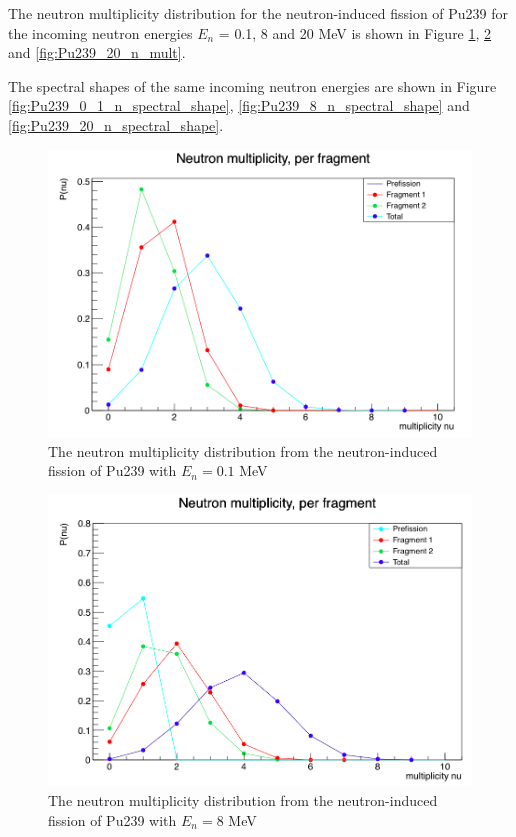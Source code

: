 \documentclass[]{article}
\begin{document}
The neutron multiplicity distribution for the neutron-induced fission of Pu239 for the incoming neutron energies $E_n$ = 0.1, 8 and 20 MeV is shown in Figure \ref{fig:Pu239_0_1_n_mult}, \ref{fig:Pu239_8_n_mult} and \ref{fig:Pu239_20_n_mult}.

The spectral shapes of the same incoming neutron energies are shown in Figure \ref{fig:Pu239_0_1_n_spectral_shape}, \ref{fig:Pu239_8_n_spectral_shape} and \ref{fig:Pu239_20_n_spectral_shape}.

\begin{figure} [H]
	\centering
	\includegraphics[scale=0.36]{Pu239_0_1_n_mult.png}
	\caption{The neutron multiplicity distribution from the neutron-induced fission of Pu239 with $E_n = 0.1$ MeV}
	\label{fig:Pu239_0_1_n_mult}
\end{figure}

\begin{figure} [H]
	\centering
	\includegraphics[scale=0.36]{Pu239_8_n_mult.png}
	\caption{The neutron multiplicity distribution from the neutron-induced fission of Pu239 with $E_n = 8$ MeV}
	\label{fig:Pu239_8_n_mult}
\end{figure}
\end{document}
